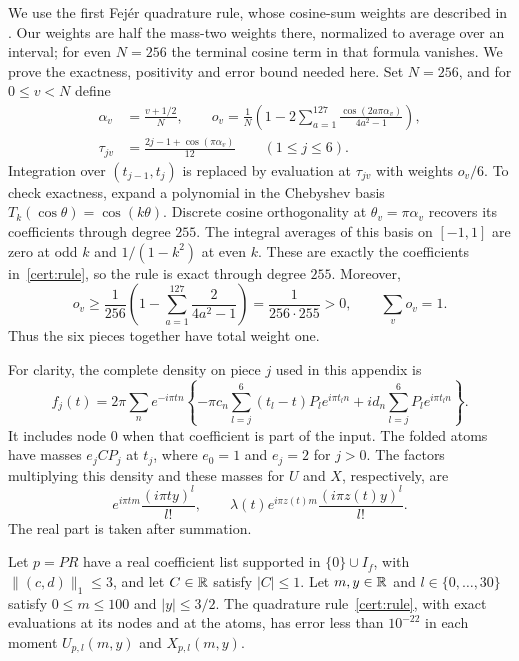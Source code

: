 We use the first Fej\'er quadrature rule, whose cosine-sum weights are
described in \cite[Section~2, formula~(2.3)]{Waldvogel2006}. Our weights
are half the mass-two weights there, normalized to average over an interval;
for even $N=256$ the terminal cosine term in that formula vanishes.
We prove the exactness, positivity and error bound needed here.
Set $N=256$, and for $0\le v<N$ define
\begin{equation}\label{cert:rule}
\begin{aligned}
 \alpha_v&=\frac{v+1/2}{N},\qquad
 o_v=\frac1N\left(1-2\sum_{a=1}^{127}
             \frac{\cos(2a\pi\alpha_v)}{4a^2-1}\right),\\
 \tau_{jv}&=\frac{2j-1+\cos(\pi\alpha_v)}{12}
       \qquad(1\le j\le6).
\end{aligned}
\end{equation}
Integration over $(t_{j-1},t_j)$ is replaced by evaluation at $\tau_{jv}$
with weights $o_v/6$.  To check exactness, expand a polynomial in the
Chebyshev basis $T_k(\cos\theta)=\cos(k\theta)$.  Discrete cosine
orthogonality at $\theta_v=\pi\alpha_v$ recovers its coefficients through
degree $255$.  The integral averages of this basis on $[-1,1]$ are zero
at odd $k$ and $1/(1-k^2)$ at even $k$.  These are exactly the coefficients
in~\eqref{cert:rule}, so the rule is exact through degree $255$.
Moreover,
\[
 o_v\ge\frac1{256}\left(1-\sum_{a=1}^{127}\frac2{4a^2-1}\right)
     =\frac1{256\cdot255}>0,\qquad \sum_v o_v=1.
\]
Thus the six pieces together have total weight one.

For clarity, the complete density on piece $j$ used in this appendix is
\begin{equation}\label{cert:density}
 f_j(t)=2\pi\sum_n e^{-i\pi tn}
 \left\{-\pi c_n\sum_{l=j}^6(t_l-t)P_l e^{i\pi t_ln}
       +i d_n\sum_{l=j}^6 P_l e^{i\pi t_ln}\right\}.
\end{equation}
It includes node $0$ when that coefficient is part of the input.  The
folded atoms have masses $e_jCP_j$ at $t_j$, where $e_0=1$ and
$e_j=2$ for $j>0$.  The factors multiplying this density and these masses
for $U$ and $X$, respectively, are
\begin{equation}\label{cert:analytic-factors}
 e^{i\pi tm}\frac{(i\pi ty)^l}{l!},\qquad
 \lambda(t)e^{i\pi z(t)m}\frac{(i\pi z(t)y)^l}{l!}.
\end{equation}
The real part is taken after summation.

\begin{lemma}\label{cert:moment-error}
Let $p=PR$ have a real coefficient list supported in $\{0\}\cup I_f$,
with $\|(c,d)\|_1\le3$, and let $C\in\mathbb R$ satisfy $|C|\le1$.
Let $m,y\in\mathbb R$ and $l\in\{0,\ldots,30\}$ satisfy
$0\le m\le100$ and $|y|\le3/2$.
The quadrature rule~\eqref{cert:rule}, with exact evaluations at its nodes
and at the atoms, has error less than $10^{-22}$ in each moment
$U_{p,l}(m,y)$ and $X_{p,l}(m,y)$.
\end{lemma}

